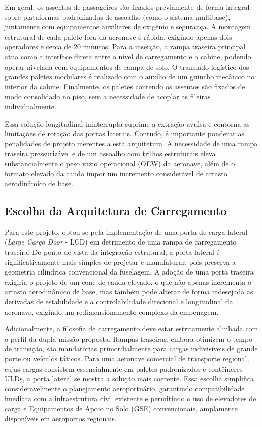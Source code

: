 Em geral, os assentos de passageiros são fixados previamente de forma integral sobre plataformas padronizadas de assoalho (como o sistema multibase), juntamente com equipamentos auxiliares de oxigênio e segurança. A montagem estrutural de cada palete fora da aeronave é rápida, exigindo apenas dois operadores e cerca de 20 minutos. Para a inserção, a rampa traseira principal atua como a interface direta entre o nível de carregamento e a cabine, podendo operar nivelada com equipamentos de rampa de solo. O translado logístico dos grandes paletes modulares é realizado com o auxílio de um guincho mecânico no interior da cabine. Finalmente, os paletes contendo os assentos são fixados de modo consolidado no piso, sem a necessidade de acoplar as fileiras individualmente.

Essa solução longitudinal ininterrupta suprime a extração avulsa e contorna as limitações de rotação das portas laterais. Contudo, é importante ponderar as penalidades de projeto inerentes a esta arquitetura. A necessidade de uma rampa traseira pressurizável e de um assoalho com trilhos estruturais eleva substancialmente o peso vazio operacional (OEW) da aeronave, além de o formato elevado da cauda impor um incremento considerável de arrasto aerodinâmico de base.

\subsection{Escolha da Arquitetura de Carregamento}

Para este projeto, optou-se pela implementação de uma porta de carga lateral (\textit{Large Cargo Door} - LCD) em detrimento de uma rampa de carregamento traseira. Do ponto de vista da integração estrutural, a porta lateral é significativamente mais simples de projetar e manufaturar, pois preserva a geometria cilíndrica convencional da fuselagem. A adoção de uma porta traseira exigiria o projeto de um cone de cauda elevado, o que não apenas incrementa o arrasto aerodinâmico de base, mas também pode alterar de forma indesejada as derivadas de estabilidade e a controlabilidade direcional e longitudinal da aeronave, exigindo um redimensionamento complexo da empenagem.

Adicionalmente, a filosofia de carregamento deve estar estritamente alinhada com o perfil da dupla missão proposta. Rampas traseiras, embora otimizem o tempo de transição, são mandatórias primordialmente para cargas indivisíveis de grande porte ou veículos táticos. Para uma aeronave comercial de transporte regional, cujas cargas consistem essencialmente em paletes padronizados e contêineres ULDs, a porta lateral se mostra a solução mais coerente. Essa escolha simplifica consideravelmente o planejamento aeroportuário, garantindo compatibilidade imediata com a infraestrutura civil existente e permitindo o uso de elevadores de carga e Equipamentos de Apoio no Solo (GSE) convencionais, amplamente disponíveis em aeroportos regionais.


